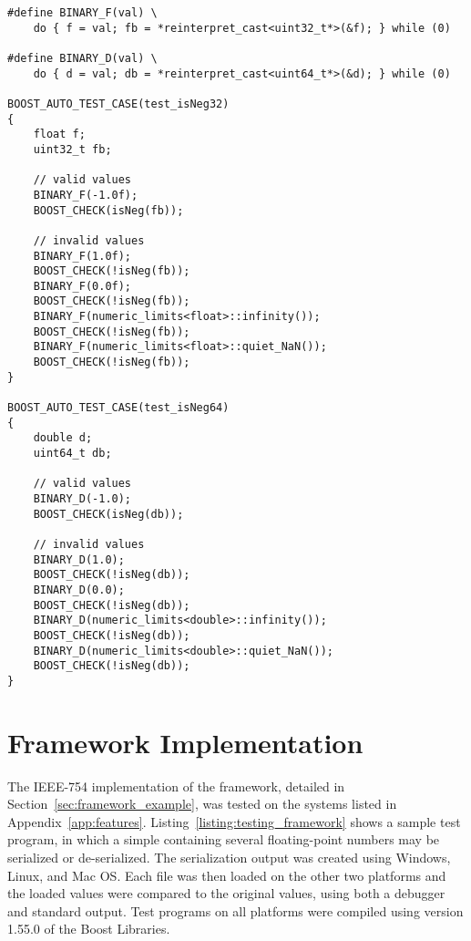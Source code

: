 \noindent
\begin{minipage}{\linewidth}
\begin{singlespace}
\begin{lstlisting}[caption=Testing the \code{isNeg()} function., label=listing:testing_isneg]
#define BINARY_F(val) \
    do { f = val; fb = *reinterpret_cast<uint32_t*>(&f); } while (0)

#define BINARY_D(val) \
    do { d = val; db = *reinterpret_cast<uint64_t*>(&d); } while (0)

BOOST_AUTO_TEST_CASE(test_isNeg32)
{
    float f;
    uint32_t fb;
    
    // valid values
    BINARY_F(-1.0f);
    BOOST_CHECK(isNeg(fb));
    
    // invalid values
    BINARY_F(1.0f);
    BOOST_CHECK(!isNeg(fb));
    BINARY_F(0.0f);
    BOOST_CHECK(!isNeg(fb));
    BINARY_F(numeric_limits<float>::infinity());
    BOOST_CHECK(!isNeg(fb));
    BINARY_F(numeric_limits<float>::quiet_NaN());
    BOOST_CHECK(!isNeg(fb));
}

BOOST_AUTO_TEST_CASE(test_isNeg64)
{
    double d;
    uint64_t db;
    
    // valid values
    BINARY_D(-1.0);
    BOOST_CHECK(isNeg(db));
    
    // invalid values
    BINARY_D(1.0);
    BOOST_CHECK(!isNeg(db));
    BINARY_D(0.0);
    BOOST_CHECK(!isNeg(db));
    BINARY_D(numeric_limits<double>::infinity());
    BOOST_CHECK(!isNeg(db));
    BINARY_D(numeric_limits<double>::quiet_NaN());
    BOOST_CHECK(!isNeg(db));
}
\end{lstlisting}
\end{singlespace}
\end{minipage}

\section{Framework Implementation}
\label{sec:testing_framework}
The IEEE-754 implementation of the framework, detailed in Section~\ref{sec:framework_example}, was tested on the systems listed in Appendix~\ref{app:features}. Listing~\ref{listing:testing_framework} shows a sample test program, in which a simple  containing several floating-point numbers may be serialized or de-serialized. The serialization output was created using Windows, Linux, and Mac OS. Each file was then loaded on the other two platforms and the loaded values were compared to the original values, using both a debugger and standard output. Test programs on all platforms were compiled using version 1.55.0 of the Boost Libraries.

